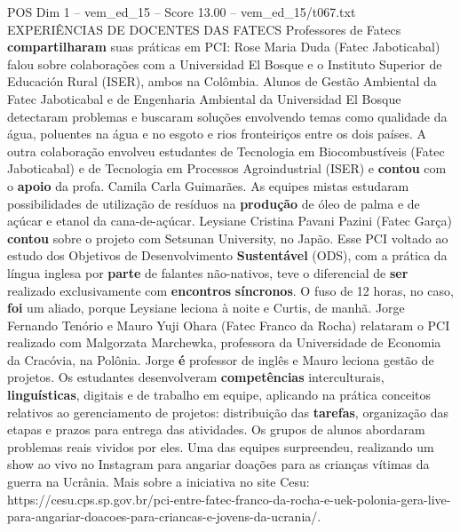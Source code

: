 \begin{textsample}{POS Dim 1 – vem\_ed\_15 – Score 13.00 – vem\_ed\_15/t067.txt}  \label{ex:f1_pos_099}
EXPERIÊNCIAS DE DOCENTES DAS FATECS Professores de Fatecs \textbf{compartilharam} suas práticas em PCI: Rose Maria Duda (Fatec Jaboticabal) falou sobre colaborações com a Universidad El Bosque e o Instituto Superior de Educación Rural (ISER), ambos na Colômbia.
Alunos de Gestão Ambiental da Fatec Jaboticabal e de Engenharia Ambiental da Universidad El Bosque detectaram problemas e buscaram soluções envolvendo temas como qualidade da água, poluentes na água e no esgoto e rios fronteiriços entre os dois países.
A outra colaboração envolveu estudantes de Tecnologia em Biocombustíveis (Fatec Jaboticabal) e de Tecnologia em Processos Agroindustrial (ISER) e \textbf{contou} com o \textbf{apoio} da profa.
Camila Carla Guimarães.
As equipes mistas estudaram possibilidades de utilização de resíduos na \textbf{produção} de óleo de palma e de açúcar e etanol da cana-de-açúcar.
Leysiane Cristina Pavani Pazini (Fatec Garça) \textbf{contou} sobre o projeto com Setsunan University, no Japão.
Esse PCI voltado ao estudo dos Objetivos de Desenvolvimento \textbf{Sustentável} (ODS), com a prática da língua inglesa por \textbf{parte} de falantes não-nativos, teve o diferencial de \textbf{ser} realizado exclusivamente com \textbf{encontros} \textbf{síncronos}.
O fuso de 12 horas, no caso, \textbf{foi} um aliado, porque Leysiane leciona à noite e Curtis, de manhã.
Jorge Fernando Tenório e Mauro Yuji Ohara (Fatec Franco da Rocha) relataram o PCI realizado com Malgorzata Marchewka, professora da Universidade de Economia da Cracóvia, na Polônia.
Jorge \textbf{é} professor de inglês e Mauro leciona gestão de projetos.
Os estudantes desenvolveram \textbf{competências} interculturais, \textbf{linguísticas}, digitais e de trabalho em equipe, aplicando na prática conceitos relativos ao gerenciamento de projetos: distribuição das \textbf{tarefas}, organização das etapas e prazos para entrega das atividades.
Os grupos de alunos abordaram problemas reais vividos por eles.
Uma das equipes surpreendeu, realizando um show ao vivo no Instagram para angariar doações para as crianças vítimas da guerra na Ucrânia.
Mais sobre a iniciativa no site Cesu: https://cesu.cps.sp.gov.br/pci-entre-fatec-franco-da-rocha-e-uek-polonia-gera-live-para-angariar-doacoes-para-criancas-e-jovens-da-ucrania/.

\end{textsample}
